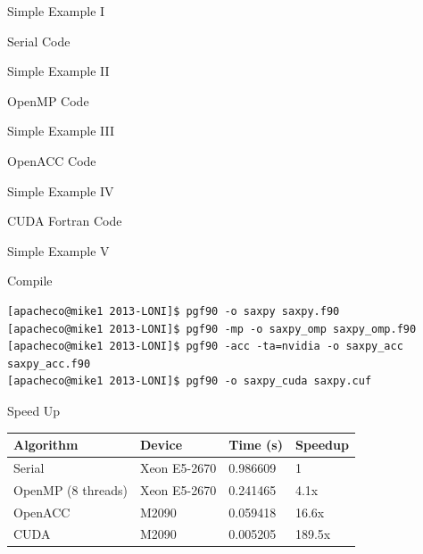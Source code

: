 \documentclass[10pt,t]{beamer}
\begin{document}
\begin{frame}[fragile]{\small Simple Example {\color{black}I}}
  \begin{exampleblock}{Serial Code}
     
  \end{exampleblock}
\end{frame}
\begin{frame}[fragile]{\small Simple Example {\color{black}II}}
  \begin{exampleblock}{OpenMP Code}
     
  \end{exampleblock}
\end{frame}
\begin{frame}[fragile]{\small Simple Example {\color{black}III}}
  \begin{exampleblock}{OpenACC Code}
     
  \end{exampleblock}
\end{frame}
\begin{frame}[fragile]{\small Simple Example {\color{black}IV}}
  \begin{exampleblock}{CUDA Fortran Code}
     
  \end{exampleblock}
\end{frame}

\begin{frame}[fragile]{\small Simple Example {\color{black}V}}
  \begin{exampleblock}{Compile}
    {\tiny
      \begin{Verbatim}
[apacheco@mike1 2013-LONI]$ pgf90 -o saxpy saxpy.f90
[apacheco@mike1 2013-LONI]$ pgf90 -mp -o saxpy_omp saxpy_omp.f90
[apacheco@mike1 2013-LONI]$ pgf90 -acc -ta=nvidia -o saxpy_acc saxpy_acc.f90
[apacheco@mike1 2013-LONI]$ pgf90 -o saxpy_cuda saxpy.cuf
      \end{Verbatim}
    }
  \end{exampleblock}
  \begin{exampleblock}{Speed Up}
    \begin{center}
      \begin{tabular}{|bbbb|}
        \hline
        \rowcolor{lublue}Algorithm & Device & Time (s) & Speedup \\
        \hline
        Serial & Xeon E5-2670 & 0.986609 & 1\\
        OpenMP (8 threads) & Xeon E5-2670 & 0.241465 & 4.1x\\
        OpenACC & M2090 & 0.059418 & 16.6x\\
        CUDA & M2090 & 0.005205 & 189.5x\\
        \hline
      \end{tabular}
    \end{center}
  \end{exampleblock}
\end{frame}
\end{document}
